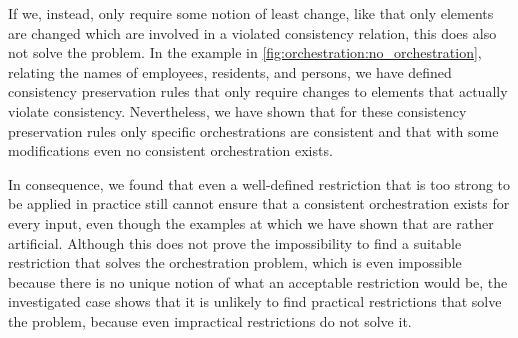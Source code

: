 If we, instead, only require some notion of least change, like that only elements are changed which are involved in a violated consistency relation, this does also not solve the problem.
In the example in \autoref{fig:orchestration:no_orchestration}, relating the names of employees, residents, and persons, we have defined consistency preservation rules that only require changes to elements that actually violate consistency.
Nevertheless, we have shown that for these consistency preservation rules only specific orchestrations are consistent and that with some modifications even no consistent orchestration exists.

In consequence, we found that even a well-defined restriction that is too strong to be applied in practice still cannot ensure that a consistent orchestration exists for every input, even though the examples at which we have shown that are rather artificial.
Although this does not prove the impossibility to find a suitable restriction that solves the orchestration problem, which is even impossible because there is no unique notion of what an acceptable restriction would be, the investigated case shows that it is unlikely to find practical restrictions that solve the problem, because even impractical restrictions do not solve it.


